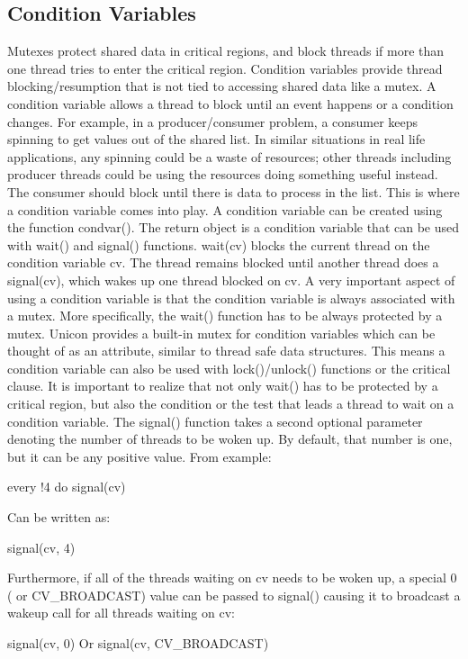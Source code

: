 \subsection{Condition Variables}
Mutexes protect shared data in critical regions, and block threads if more than
one thread tries to enter the critical region. Condition variables provide
thread blocking/resumption that is not tied to accessing
shared data like a mutex. A condition variable allows a thread to block until
an event happens or a condition changes. For example, in a producer/consumer
problem, a consumer keeps spinning to get values out of the
shared list. In similar situations in real life applications, any spinning could
be a waste of resources; other threads including producer threads could be using
the resources doing something useful instead. The consumer should block until
there is data to process in the list. This is where a condition variable comes
into play.  A condition variable can be created using the function condvar().
The return object is a condition variable that can be used with wait() and
signal() functions. wait(cv) blocks the current thread on the
condition variable cv. The thread remains blocked until another thread does
a signal(cv), which wakes up one
thread blocked on cv. A very important aspect of using a condition variable is
that the condition variable is always associated with a mutex. More specifically,
the wait() function has to be always protected by a mutex.
Unicon provides a built-in mutex for condition variables which can be thought
of as an attribute, similar to thread safe data structures. This means a condition
variable can also be used with lock()/unlock() functions
or the critical clause. It is important to realize that not only wait() has to be
protected by a critical region, but also the condition or the test that leads
a thread to wait on a condition variable. The signal() function takes a second
optional parameter denoting the number of threads to be woken up.
By default, that number is one, but it can be any positive value. From example:

every !4 do signal(cv)

Can be written as:

signal(cv, 4)

Furthermore, if all of the threads waiting on cv needs to be woken up, a special 0
( or CV\_BROADCAST) value can be passed to signal() causing it to broadcast a wakeup
call for all threads waiting on cv:

signal(cv, 0) 
Or
signal(cv, CV\_BROADCAST) 




